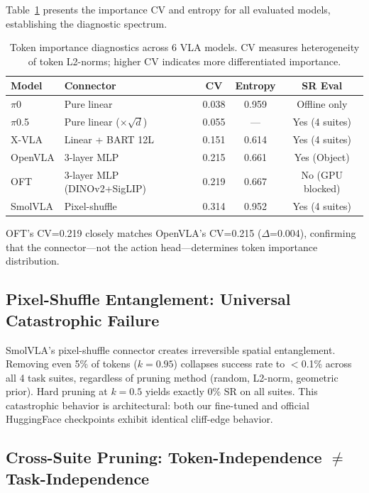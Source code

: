 \documentclass[letterpaper]{article}
\begin{document}
Table~\ref{tab:diagnostic} presents the importance CV and entropy for all evaluated models, establishing the diagnostic spectrum.

\begin{table}[h]
\centering
\caption{Token importance diagnostics across 6 VLA models. CV measures heterogeneity of token L2-norms; higher CV indicates more differentiated importance.}
\label{tab:diagnostic}
\begin{tabular}{llccc}
\toprule
Model & Connector & CV & Entropy & SR Eval \\
\midrule
$\pi$0 & Pure linear & 0.038 & 0.959 & Offline only \\
$\pi$0.5 & Pure linear ($\times\sqrt{d}$) & 0.055 & --- & Yes (4 suites) \\
X-VLA & Linear + BART 12L & 0.151 & 0.614 & Yes (4 suites) \\
OpenVLA & 3-layer MLP & 0.215 & 0.661 & Yes (Object) \\
OFT & 3-layer MLP (DINOv2+SigLIP) & 0.219 & 0.667 & No (GPU blocked) \\
SmolVLA & Pixel-shuffle & 0.314 & 0.952 & Yes (4 suites) \\
\bottomrule
\end{tabular}
\end{table}

OFT's CV=0.219 closely matches OpenVLA's CV=0.215 ($\Delta$=0.004), confirming that the connector---not the action head---determines token importance distribution.

\subsection{Pixel-Shuffle Entanglement: Universal Catastrophic Failure}

SmolVLA's pixel-shuffle connector creates irreversible spatial entanglement.
Removing even 5\% of tokens ($k=0.95$) collapses success rate to $<$0.1\% across all 4 task suites, regardless of pruning method (random, L2-norm, geometric prior).
Hard pruning at $k=0.5$ yields exactly 0\% SR on all suites.
This catastrophic behavior is architectural: both our fine-tuned and official HuggingFace checkpoints exhibit identical cliff-edge behavior.

\subsection{Cross-Suite Pruning: Token-Independence $\neq$ Task-Independence}
\end{document}
